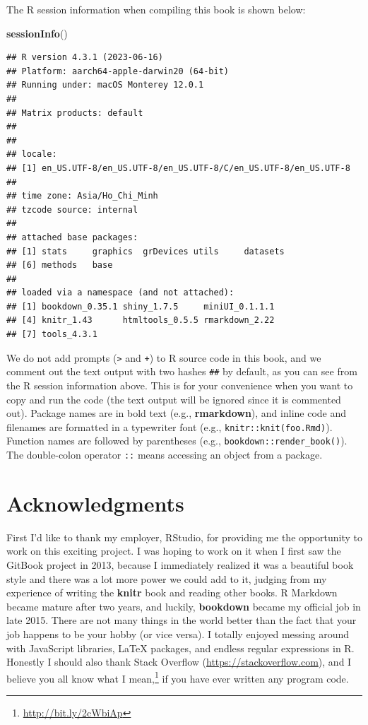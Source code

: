 \documentclass[
  12pt,
]{krantz}
\newenvironment{Shaded}{\begin{snugshade}}{\end{snugshade}}
\newcommand{\FunctionTok}[1]{\textcolor[rgb]{0.13,0.29,0.53}{\textbf{#1}}}
\newcommand{\NormalTok}[1]{#1}
\renewcommand{\href}[2]{#2\footnote{\url{#1}}}
\begin{document}
The R session information when compiling this book is shown below:

\begin{Shaded}
\begin{Highlighting}[]
\FunctionTok{sessionInfo}\NormalTok{()}
\end{Highlighting}
\end{Shaded}

\begin{verbatim}
## R version 4.3.1 (2023-06-16)
## Platform: aarch64-apple-darwin20 (64-bit)
## Running under: macOS Monterey 12.0.1
## 
## Matrix products: default
## 
## 
## locale:
## [1] en_US.UTF-8/en_US.UTF-8/en_US.UTF-8/C/en_US.UTF-8/en_US.UTF-8
## 
## time zone: Asia/Ho_Chi_Minh
## tzcode source: internal
## 
## attached base packages:
## [1] stats     graphics  grDevices utils     datasets 
## [6] methods   base     
## 
## loaded via a namespace (and not attached):
## [1] bookdown_0.35.1 shiny_1.7.5     miniUI_0.1.1.1 
## [4] knitr_1.43      htmltools_0.5.5 rmarkdown_2.22 
## [7] tools_4.3.1
\end{verbatim}

We do not add prompts (\texttt{\textgreater{}} and \texttt{+}) to R source code in this book, and we comment out the text output with two hashes \texttt{\#\#} by default, as you can see from the R session information above. This is for your convenience when you want to copy and run the code (the text output will be ignored since it is commented out). Package names are in bold text (e.g., \textbf{rmarkdown}), and inline code and filenames are formatted in a typewriter font (e.g., \texttt{knitr::knit(\textquotesingle{}foo.Rmd\textquotesingle{})}). Function names are followed by parentheses (e.g., \texttt{bookdown::render\_book()}). The double-colon operator \texttt{::} means accessing an object from a package.

\hypertarget{acknowledgments}{%
\section*{Acknowledgments}\label{acknowledgments}}


First I'd like to thank my employer, RStudio, for providing me the opportunity to work on this exciting project. I was hoping to work on it when I first saw the GitBook project in 2013, because I immediately realized it was a beautiful book style and there was a lot more power we could add to it, judging from my experience of writing the \textbf{knitr} book \citep{xie2015} and reading other books. R Markdown became mature after two years, and luckily, \textbf{bookdown} became my official job in late 2015. There are not many things in the world better than the fact that your job happens to be your hobby (or vice versa). I totally enjoyed messing around with JavaScript libraries, LaTeX packages, and endless regular expressions in R. Honestly I should also thank Stack Overflow (\url{https://stackoverflow.com}), and I believe you all know \href{http://bit.ly/2cWbiAp}{what I mean,} if you have ever written any program code.
\end{document}
